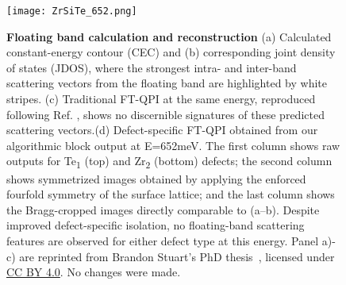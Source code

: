 \begin{figure}
	\texttt{[image: ZrSiTe\_652.png]} 
	\centering
	\captionsetup{width=1.2\textwidth}
	\caption[\textbf{Floating band calculation and reconstruction}]{\textbf{Floating band calculation and reconstruction} (a) Calculated constant-energy contour (CEC) and (b) corresponding joint density of states (JDOS), where the strongest intra- and inter-band scattering vectors from the floating band are highlighted by white stripes. (c) Traditional FT-QPI at the same energy, reproduced following Ref. \cite{stuartScanningTunnellingMicroscopy2021}, shows no discernible signatures of these predicted scattering vectors.(d) Defect-specific FT-QPI obtained from our algorithmic block output at E=652meV. The first column shows raw outputs for Te\textsubscript{1} (top) and Zr\textsubscript{2} (bottom) defects; the second column shows symmetrized images obtained by applying the enforced fourfold symmetry of the surface lattice; and the last column shows the Bragg-cropped images directly comparable to (a–b). Despite improved defect-specific isolation, no floating-band scattering features are observed for either defect type at this energy. Panel a)-c) are reprinted from Brandon Stuart's PhD thesis~\cite{stuartQuasiparticleInterferenceObservation2022}, licensed under \href{http://creativecommons.org/licenses/by/4.0/}{CC BY 4.0}. No changes were made.}
	\label{fig:ZrSiTe_652}
\end{figure}


